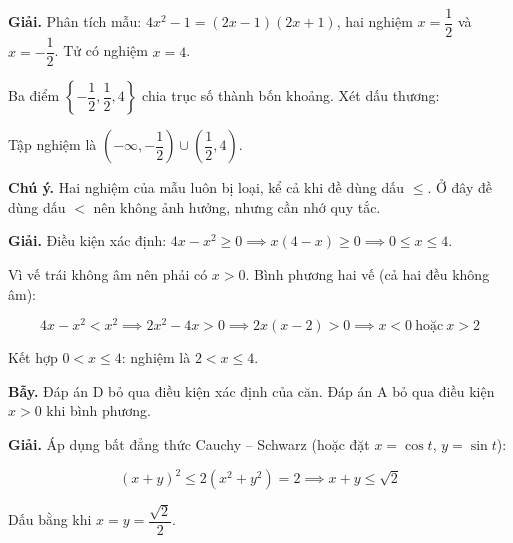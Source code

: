 \documentclass[11pt, a4paper]{article}
\begin{document}
\begin{dapan}[10 — Đáp án A]
\textbf{Giải.} Phân tích mẫu: $4x^2 - 1 = (2x-1)(2x+1)$, hai nghiệm $x = \dfrac{1}{2}$ và $x = -\dfrac{1}{2}$. Tử có nghiệm $x = 4$.

Ba điểm $\left\{-\dfrac{1}{2}, \dfrac{1}{2}, 4\right\}$ chia trục số thành bốn khoảng. Xét dấu thương:


Tập nghiệm là $\left(-\infty, -\dfrac{1}{2}\right) \cup \left(\dfrac{1}{2}, 4\right)$.

\textbf{Chú ý.} Hai nghiệm của mẫu luôn bị loại, kể cả khi đề dùng dấu $\le$. Ở đây đề dùng dấu $<$ nên không ảnh hưởng, nhưng cần nhớ quy tắc.
\end{dapan}

\begin{dapan}[11 — Đáp án C]
\textbf{Giải.} Điều kiện xác định: $4x - x^2 \ge 0 \implies x(4-x) \ge 0 \implies 0 \le x \le 4$.

Vì vế trái không âm nên phải có $x > 0$. Bình phương hai vế (cả hai đều không âm):

$$4x - x^2 < x^2 \implies 2x^2 - 4x > 0 \implies 2x(x-2) > 0 \implies x < 0 \ \text{hoặc} \ x > 2$$

Kết hợp $0 < x \le 4$: nghiệm là $2 < x \le 4$.

\textbf{Bẫy.} Đáp án D bỏ qua điều kiện xác định của căn. Đáp án A bỏ qua điều kiện $x>0$ khi bình phương.
\end{dapan}

\begin{dapan}[12 — Đáp án B]
\textbf{Giải.} Áp dụng bất đẳng thức Cauchy – Schwarz (hoặc đặt $x = \cos t$, $y = \sin t$):

$$(x+y)^2 \le 2(x^2 + y^2) = 2 \implies x + y \le \sqrt{2}$$

Dấu bằng khi $x = y = \dfrac{\sqrt{2}}{2}$.
\end{dapan}
\end{document}
